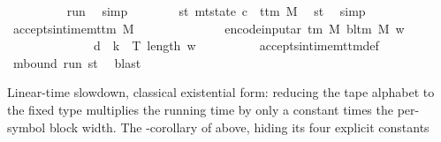 \begin{isabellebody}
\ \ \ \ \ \ \ \ \isamarkupfalse%
\ run\ \isamarkupfalse%
\ simp\isanewline
\ \ \ \ \ \ \isamarkupfalse%
\ st{\isacharprime}{\kern0pt}{\isacharprime}{\kern0pt}{\isacharprime}{\kern0pt}{\isacharcolon}{\kern0pt}\ {\isachardoublequoteopen}mt{\isacharunderscore}{\kern0pt}state\ c{\isacharprime}{\kern0pt}{\isacharprime}{\kern0pt}\ {\isacharequal}{\kern0pt}\ t{\isacharunderscore}{\kern0pt}tm\ {\isacharquery}{\kern0pt}M{\isacharprime}{\kern0pt}{\isachardoublequoteclose}\ \isamarkupfalse%
\ st{\isacharprime}{\kern0pt}{\isacharprime}{\kern0pt}\ \isamarkupfalse%
\ simp\isanewline
\ \ \ \ \ \ \isamarkupfalse%
\ {\isachardoublequoteopen}accepts{\isacharunderscore}{\kern0pt}in{\isacharunderscore}{\kern0pt}time{\isacharunderscore}{\kern0pt}mttm\ {\isacharquery}{\kern0pt}M{\isacharprime}{\kern0pt}\isanewline
\ \ \ \ \ \ \ \ \ \ \ \ \ \ {\isacharparenleft}{\kern0pt}encode{\isacharunderscore}{\kern0pt}input{\isacharunderscore}{\kern0pt}ar\ {\isacharparenleft}{\kern0pt}{\isasymGamma}{\isacharunderscore}{\kern0pt}tm\ M{\isacharparenright}{\kern0pt}\ {\isacharparenleft}{\kern0pt}bl{\isacharunderscore}{\kern0pt}tm\ M{\isacharparenright}{\kern0pt}\ w{\isacharparenright}{\kern0pt}\isanewline
\ \ \ \ \ \ \ \ \ \ \ \ \ \ {\isacharparenleft}{\kern0pt}{\isacharquery}{\kern0pt}d\ {\isacharasterisk}{\kern0pt}\ {\isacharquery}{\kern0pt}k\ {\isacharasterisk}{\kern0pt}\ T\ {\isacharparenleft}{\kern0pt}length\ w{\isacharparenright}{\kern0pt}{\isacharparenright}{\kern0pt}{\isachardoublequoteclose}\isanewline
\ \ \ \ \ \ \ \ \isamarkupfalse%
\ accepts{\isacharunderscore}{\kern0pt}in{\isacharunderscore}{\kern0pt}time{\isacharunderscore}{\kern0pt}mttm{\isacharunderscore}{\kern0pt}def\isanewline
\ \ \ \ \ \ \ \ \isamarkupfalse%
\ m{\isacharunderscore}{\kern0pt}bound\ run{\isacharprime}{\kern0pt}\ st{\isacharprime}{\kern0pt}{\isacharprime}{\kern0pt}{\isacharprime}{\kern0pt}\ \isamarkupfalse%
\ blast\isanewline
\ \ \isamarkupfalse%
\isanewline
{}\isamarkupfalse%
%
\endisatagproof
{\isafoldproof}%
%
\isadelimproof
%
\endisadelimproof
%
\begin{isamarkuptext}%
Linear-time slowdown, classical existential form: reducing the tape
  alphabet to the fixed type  multiplies the running time by only a
  constant times the per-symbol block width.  The -corollary of
   above, hiding its four explicit constants

\end{isamarkuptext}
\end{isabellebody}
